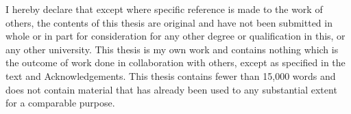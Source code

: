 
\begin{declaration}

I hereby declare that except where specific reference is made to the work of
others, the contents of this thesis are original and have not been
submitted in whole or in part for consideration for any other degree or
qualification in this, or any other university. This thesis is my own
work and contains nothing which is the outcome of work done in collaboration
with others, except as specified in the text and Acknowledgements. This
thesis contains fewer than 15,000 words and does not contain material that has already been used to any substantial extent for a comparable purpose.


\end{declaration}
